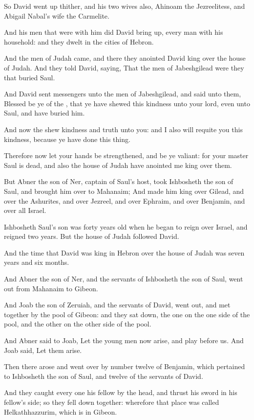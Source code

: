 \verse So David went up thither, and his two wives also, Ahinoam the Jezreelitess, and Abigail Nabal's wife the Carmelite.

\verse And his men that were with him did David bring up, every man with his household: and they dwelt in the cities of Hebron.

\verse And the men of Judah came, and there they anointed David king over the house of Judah. And they told David, saying, That the men of Jabeshgilead were they that buried Saul.

\verse And David sent messengers unto the men of Jabeshgilead, and said unto them, Blessed be ye of the \LORD, that ye have shewed this kindness unto your lord, even unto Saul, and have buried him.

\verse And now the \LORD shew kindness and truth unto you: and I also will requite you this kindness, because ye have done this thing.

\verse Therefore now let your hands be strengthened, and be ye valiant: for your master Saul is dead, and also the house of Judah have anointed me king over them.

\verse But Abner the son of Ner, captain of Saul's host, took Ishbosheth the son of Saul, and brought him over to Mahanaim; \verse And made him king over Gilead, and over the Ashurites, and over Jezreel, and over Ephraim, and over Benjamin, and over all Israel.

\verse Ishbosheth Saul's son was forty years old when he began to reign over Israel, and reigned two years. But the house of Judah followed David.

\verse And the time that David was king in Hebron over the house of Judah was seven years and six months.

\verse And Abner the son of Ner, and the servants of Ishbosheth the son of Saul, went out from Mahanaim to Gibeon.

\verse And Joab the son of Zeruiah, and the servants of David, went out, and met together by the pool of Gibeon: and they sat down, the one on the one side of the pool, and the other on the other side of the pool.

\verse And Abner said to Joab, Let the young men now arise, and play before us. And Joab said, Let them arise.

\verse Then there arose and went over by number twelve of Benjamin, which pertained to Ishbosheth the son of Saul, and twelve of the servants of David.

\verse And they caught every one his fellow by the head, and thrust his sword in his fellow's side; so they fell down together: wherefore that place was called Helkathhazzurim, which is in Gibeon.

